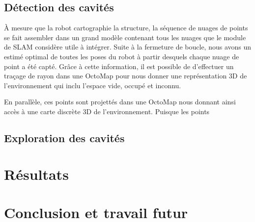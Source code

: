 \subsection{Détection des cavités}

À mesure que la robot cartographie la structure, la séquence de nuages de points se fait assembler dans un grand modèle contenant tous les nuages que le module de SLAM considère utile à intégrer. Suite à la fermeture de boucle, nous avons un estimé optimal de toutes les poses du robot à partir desquels chaque nuage de point a été capté. Grâce à cette information, il est possible de d'effectuer un traçage de rayon dans une OctoMap pour nous donner une représentation 3D de l'environnement qui inclu l'espace vide, occupé et inconnu.


En parallèle, ces points sont projettés dans une OctoMap \citep{Hornung2013} nous donnant ainsi accès à une carte discrète 3D de l'environnement. Puisque les points 

\subsection{Exploration des cavités}




\section{Résultats} \label{sec:ugv_results}

\section{Conclusion et travail futur}
